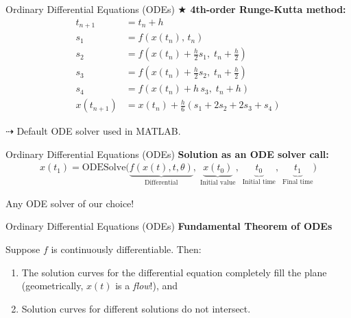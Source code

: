 \documentclass[aspectratio=169,xcolor=dvipsnames,svgnames,x11names,fleqn]{beamer}
\begin{document}
\begin{frame}{Ordinary Differential Equations (ODEs)}
  \textbf{\Large $\bigstar$ 4th-order Runge-Kutta method:}
  \begin{align*}
    t_{n+1} &= t_n + h\\
    s_1 &= f(x(t_n),\, t_n)\\
    s_2 &= f\!\left(x(t_n)+\tfrac{h}{2}s_1,\; t_n+\tfrac{h}{2}\right)\\
    s_3 &= f\!\left(x(t_n)+\tfrac{h}{2}s_2,\; t_n+\tfrac{h}{2}\right)\\
    s_4 &= f(x(t_n)+h\,s_3,\; t_n+h)\\
    x(t_{n+1}) &= x(t_n) + \frac{h}{6}(s_1 + 2s_2 + 2s_3 + s_4)
  \end{align*}
 
  \hfill $\dashrightarrow$ Default ODE solver used in MATLAB.
\end{frame}
 
\begin{frame}{Ordinary Differential Equations (ODEs)}
  \textbf{Solution as an ODE solver call:}
  \begin{align*}
    x(t_1) = \mathrm{ODESolve}\!\bigl(\underbrace{f(x(t),t,\theta)}_{\text{Differential}},\;
                                       \underbrace{x(t_0)}_{\text{Initial value}},\;
                                       \underbrace{t_0}_{\text{Initial time}},\;
                                       \underbrace{t_1}_{\text{Final time}}\bigr)
  \end{align*}
 
  Any ODE solver of our choice!
\end{frame}
 
\begin{frame}{Ordinary Differential Equations (ODEs)}
  \textbf{Fundamental Theorem of ODEs}
 
  Suppose $f$ is continuously differentiable. Then:
  \begin{enumerate}
    \item The solution curves for the differential equation completely fill the plane
          (geometrically, $x(t)$ is a \emph{flow}!), and
    \item Solution curves for different solutions do not intersect.
  \end{enumerate}
\end{frame}
 
\end{document}

